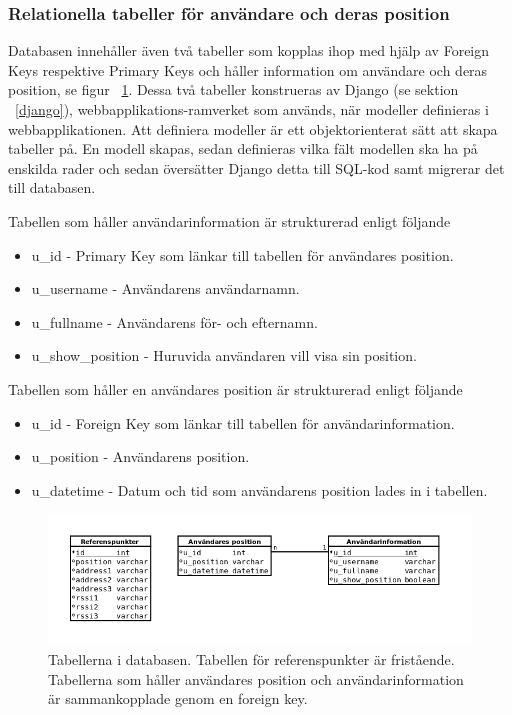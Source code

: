 \documentclass[a4paper,12pt]{article}
\begin{document}
 \subsubsection{Relationella tabeller för användare och deras position}
 Databasen innehåller även två tabeller som
 kopplas ihop med hjälp av Foreign Keys respektive Primary Keys och håller information om användare och deras position, se figur ~\ref{fig:db_tabeller}.
 Dessa två tabeller konstrueras av Django (se sektion ~\ref{django}), webbapplikations-ramverket som används, när modeller definieras i webbapplikationen. Att definiera modeller är ett objektorienterat sätt att skapa tabeller på. En modell skapas, sedan definieras vilka fält modellen ska ha på enskilda rader och sedan översätter Django detta till SQL-kod samt migrerar det till databasen.

 Tabellen som håller användarinformation är strukturerad enligt följande
 \begin{itemize}
   \item  u\_id - Primary Key som länkar till tabellen för användares position.
   \item  u\_username - Användarens användarnamn.
   \item  u\_fullname - Användarens för- och efternamn.
   \item  u\_show\_position - Huruvida användaren vill visa sin position.
 \end{itemize}

 Tabellen som håller en användares position är strukturerad enligt följande
 \begin{itemize}
   \item u\_id - Foreign Key som länkar till tabellen för användarinformation.
   \item u\_position - Användarens position.
   \item u\_datetime - Datum och tid som användarens position lades in i tabellen.
 \end{itemize}

 \begin{figure}[H]
   \includegraphics[width=15cm]{media/db_tabeller.png}
   \caption{Tabellerna i databasen. Tabellen för referenspunkter är fristående. Tabellerna som håller användares position och användarinformation är sammankopplade genom en foreign key.}
   \label{fig:db_tabeller}
 \end{figure}
\end{document}
